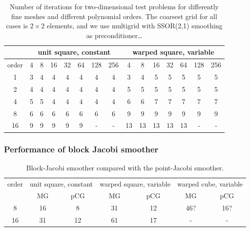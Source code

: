 \documentclass[smallcondensed,final]{svjour3}     %
\begin{document}
\begin{table}[h]\centering
\caption{\label{tab:meshInd} Number of iterations for two-dimensional
  test problems for differently fine meshes and different polynomial
  orders. The coarsest grid for all cases is $2\times 2$ elements, and
  we use multigrid with SSOR(2,1) smoothing as preconditioner\ldots }
\begin{tabular}{|c|c|c|c|c|c|c|c||c|c|c|c|c|c|c|}
	\hline
	 & \multicolumn{7}{c||}{unit square, constant} & \multicolumn{7}{c|}{warped square, variable} \\  
  \hline
	order & 4  &  8 & 16 & 32 & 64 & 128 & 256 & 4  &  8 & 16 & 32 & 64 & 128 & 256 \\
	\hline 
	 1    &  3 &  4 &  4 &  4 &  4 &  4  &  4  & 3  &  4 & 5  &  5 &  5 &  5  &  5  \\
	 2    &  4 &  4 &  4 &  4 &  4 &  4  &  4  & 5  &  5 & 5  &  5 &  5 &  5  &  5  \\
	 4    &  5 &  5 &  4 &  4 &  4 &  4  &  4  & 6  &  6 & 7  &  7 &  7 &  7  &  7  \\
	 8    &  6 &  6 &  6 &  6 &  6 &  6  &  6  & 9  &  9 & 9  &  9 &  9 &  9  &  9  \\
	 16   &  9 &  9 &  9 &  9 &  9 &  -  &  -  & 13 & 13 & 13 & 13 & 13 &  -  &  -  \\
	 \hline
\end{tabular}

\end{table}

\subsubsection{Performance of block Jacobi smoother}\label{subsec:num_block}



\begin{table}
	\caption{\label{tab:block-jac} Block-Jacobi smoother compared with the point-Jacobi smoother.}
\begin{center}

\begin{tabular}{|c|c|c|c|c|c|c|}
	\hline
	order & \multicolumn{2}{c|}{unit square, constant} & \multicolumn{2}{c|}{warped square, variable} & \multicolumn{2}{c|}{warped cube, variable} \\
	\cline{2-7}
	 & MG & pCG  & MG & pCG & MG & pCG \\
	\hline
	8  & 16 & 8  &  31  & 12 & 46? & 16? \\
	16 & 31 & 12 &  61  & 17 &  -  &  -  \\
	\hline
\end{tabular}
\end{center}
\end{table}
\end{document}
